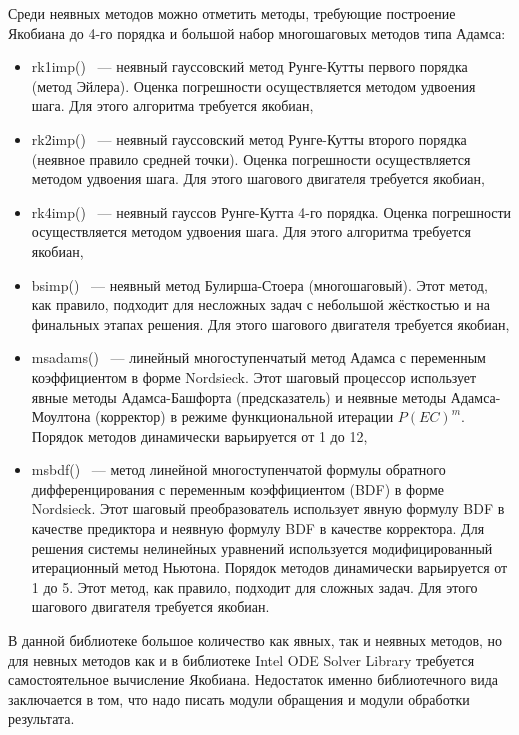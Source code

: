 Среди неявных методов можно отметить методы, требующие построение Якобиана до 4-го порядка и большой набор многошаговых методов типа
Адамса:
\begin{itemize}
    \item rk1imp() ~--- неявный гауссовский метод Рунге-Кутты первого порядка (метод Эйлера). Оценка погрешности осуществляется методом
        удвоения шага. Для этого алгоритма требуется якобиан,
    \item rk2imp() ~--- неявный гауссовский метод Рунге-Кутты второго порядка (неявное правило средней точки). Оценка
        погрешности осуществляется методом удвоения шага. Для этого шагового двигателя требуется якобиан,
    \item rk4imp() ~--- неявный гауссов Рунге-Кутта 4-го порядка. Оценка погрешности осуществляется методом удвоения шага. Для этого
        алгоритма требуется якобиан,
    \item bsimp() ~--- неявный метод Булирша-Стоера (многошаговый). Этот метод, как правило, подходит для несложных задач с небольшой
        жёсткостью и на финальных этапах решения. Для этого
        шагового двигателя требуется якобиан,
    \item msadams() ~--- линейный многоступенчатый метод Адамса с переменным коэффициентом в форме Nordsieck. Этот шаговый процессор
        использует явные методы Адамса-Башфорта (предсказатель) и неявные методы Адамса-Моултона (корректор) в режиме функциональной
        итерации $P(EC)^m$. Порядок методов динамически варьируется от 1 до 12,
    \item msbdf() ~--- метод линейной многоступенчатой формулы обратного дифференцирования с переменным коэффициентом (BDF) в форме
        Nordsieck. Этот шаговый преобразователь использует явную формулу BDF в качестве предиктора и неявную формулу BDF в качестве
        корректора. Для решения системы нелинейных уравнений используется модифицированный итерационный метод Ньютона. Порядок методов
        динамически варьируется от 1 до 5. Этот метод, как правило, подходит для сложных задач. Для этого шагового двигателя требуется
        якобиан.
\end{itemize}

В данной библиотеке большое количество как явных, так и неявных методов, но для невных методов как и в библиотеке Intel ODE Solver
Library требуется самостоятельное вычисление Якобиана. Недостаток именно библиотечного вида заключается в том, что надо писать модули
обращения и модули обработки результата.

